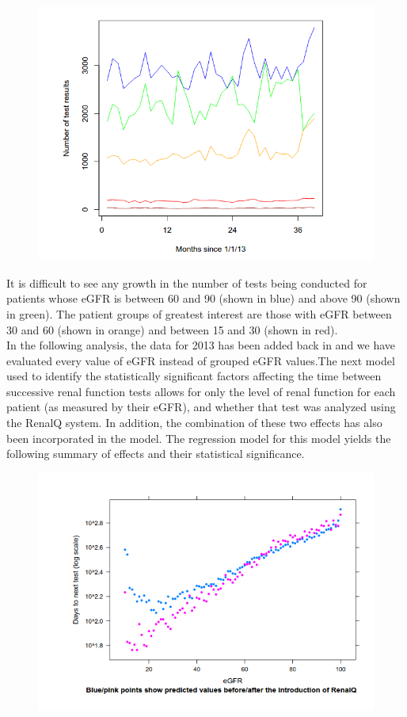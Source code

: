 \documentclass[11pt]{article}
\begin{document}
\begin{figure}[htp]
\centering
\includegraphics[scale=0.50]{fig6.png}
\caption{}
\label{}
\end{figure}

It is difficult to see any growth in the number of tests being conducted for patients whose eGFR is between 60 and 90 (shown in blue) and above 90 (shown in green). The patient groups of greatest interest are those with eGFR between 30 and 60 (shown in orange) and between 15 and 30 (shown in red).\\

In the following analysis, the data for 2013 has been added back in and we have evaluated every value of eGFR instead of grouped eGFR values.The next  model  used to identify the statistically significant factors affecting the time between successive renal function tests allows for only the level of renal function for each patient (as measured by their eGFR), and whether that test was analyzed using the RenalQ system. In addition, the combination of these two effects has also been incorporated in the model. The regression model for this model yields  the following summary of effects and their statistical significance. \\

\begin{figure}[htp]
\centering
\includegraphics[scale=0.50]{FigCritical.png}
\caption{}
\label{}
\end{figure}
\end{document}
